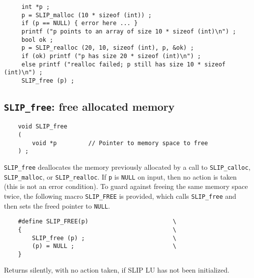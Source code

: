 \documentclass[12pt]{article}
\theoremstyle{definition}
\begin{document}
\begin{mdframed}[userdefinedwidth=6in]
{\footnotesize
\begin{verbatim}
     int *p ;
     p = SLIP_malloc (10 * sizeof (int)) ;
     if (p == NULL) { error here ... }
     printf ("p points to an array of size 10 * sizeof (int)\n") ;
     bool ok ;
     p = SLIP_realloc (20, 10, sizeof (int), p, &ok) ;
     if (ok) printf ("p has size 20 * sizeof (int)\n") ;
     else printf ("realloc failed; p still has size 10 * sizeof (int)\n") ;
     SLIP_free (p) ;
\end{verbatim}
} \end{mdframed}

\cprotect\subsection{\verb|SLIP_free|: free allocated memory}
\label{ss:SLIP_free}

\begin{mdframed}[userdefinedwidth=6in]
{\footnotesize
\begin{verbatim}
    void SLIP_free
    (
        void *p         // Pointer to memory space to free
    ) ;
\end{verbatim}
} \end{mdframed}

\verb|SLIP_free| deallocates the memory previously allocated by a call to
\verb|SLIP_calloc|, \verb|SLIP_malloc|, or \verb|SLIP_realloc|.  If \verb|p| is
\verb|NULL| on input, then no action is taken (this is not an error condition).
To guard against freeing the same memory space twice, the following macro
\verb|SLIP_FREE| is provided, which calls \verb|SLIP_free| and then sets the
freed pointer to \verb|NULL|.

\begin{mdframed}[userdefinedwidth=6in]
{\footnotesize
\begin{verbatim}
    #define SLIP_FREE(p)                        \
    {                                           \
        SLIP_free (p) ;                         \
        (p) = NULL ;                            \
    }
\end{verbatim}
} \end{mdframed}

Returns silently, with no action taken, if SLIP LU has not been initialized.
\end{document}
